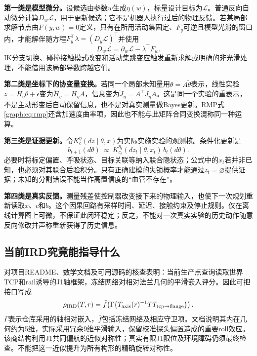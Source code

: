 \documentclass[11pt,a4paper]{article}
\numberwithin{equation}{section}
\theoremstyle{definition}
\begin{document}
\textbf{第一类是模型微分。}设候选由参数$w$生成$\eta(w)$，标量设计目标为$\mathcal L$。普通反向自动微分计算$D_w\mathcal L$，用于更新候选；它不是机器人执行过后的物理反馈。若某局部求解节点由$F(y,w)=0$定义，只有在所用活动集固定、$F_y$可逆且模型光滑的窗口内，才能解伴随方程$F_y^\top\lambda=(D_y\mathcal L)^\top$并使用
\begin{equation}
 D_w\mathcal L=\partial_w\mathcal L-\lambda^\top F_w.
 \label{graph:eq:implicit-ad}
\end{equation}
IK分支切换、碰撞接触模式改变和活动集跳变应触发重新求解或明确的非光滑处理，不能借用该局部导数跨越它们。

\textbf{第二类是坐标下的协变量变换。}若同一个局部未知量用$\theta=A\tilde\theta$表示，线性实验$z=H_\eta\theta+\epsilon$变为$\tilde H_\eta=H_\eta A$，信息变为$\tilde J_\eta=A^\top J_\eta A$。这是同一个实验的重表示，不是主动形变后自动保留信息，也不是对真实测量做Bayes更新。RMP式\eqref{graph:eq:rmp}还含加速度曲率项，因此也不能与此矩阵合同变换混称同一种运算。

\textbf{第三类是证据更新。}令$K_c^\eta(dz\mid\theta,x)$为实际实施实验的观测核。条件化更新是
\begin{equation}
 b_{t+1}(d\theta)\ \propto\ K_{c_t}^{\eta_t}(dz_t\mid\theta,x_t)\,b_t(d\theta).
 \label{graph:eq:bayes}
\end{equation}
必要时将标定偏置、呼吸状态、目标关联等纳入联合隐状态；公式中的$x_t$若并非已知，也必须对其联合后验积分。只有正确建模的失锁概率才能通过$z_t=\varnothing$提供证据；未知的分割错误不能当作高置信度的``血管不存在''。

\textbf{第四类是真实反馈。}测量残差使控制器改变接下来的物理输入，也使下一次规划重新读取$x$、$c$和$b$。这个因果回路有采样时间、延迟、接触约束及停止规则。仅在离线计算图上可微，不保证此闭环稳定；反之，不能对一次真实实验的历史动作随意反向修改并声称重新获得了历史信息。

\subsection{当前IRD究竟能指导什么}
\label{graph:sec:ird}

对项目README、数学文档及可用源码的核查表明：当前生产点查询读取世界TCP和rail诱导的J1轴框架，冻结网络对相对法兰几何的平滑嵌入评分\cite{irdrepo}。因此可把接口写成
\begin{equation}
 \rho_{\rm IRD}(T,r)
 =\bar f\!\left(\Gamma\!\left(T_{\rm axis}(r)^{-1}T T_{\rm tcp\to flange}\right)\right).
 \label{graph:eq:irdquery}
\end{equation}
$\Gamma$表示仓库采用的轴相对嵌入，$\bar f$包括冻结网络及相应守卫项。文档说明其内在几何约为5维，实际采用冗余9维平滑输入，保留校准探头偏置造成的重要roll效应。该商结构利用J1共同偏航的近似对称性；真实有限J1限位及环境障碍仍须最终检查。不能把这一近似提升为所有构形的精确旋转对称性。
\end{document}
